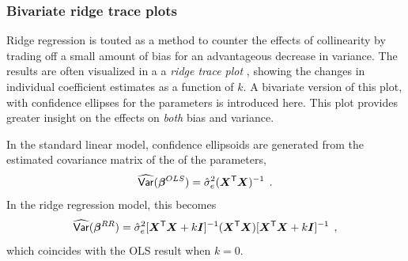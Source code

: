 \subsubsection{Bivariate ridge trace plots}

Ridge regression is touted as a method to counter the effects
of collinearity by trading off a small amount of bias for an
advantageous decrease in variance.  The results are often 
visualized in a a \emph{ridge trace plot}
\citep{HoerlKennard:1970b},
showing the changes
in individual coefficient estimates as a function of $k$.
A bivariate version of this plot, with confidence ellipses for
the parameters is introduced here.  This plot provides greater
insight on the effects on \emph{both} bias and variance.

In the standard linear model, confidence ellipsoids are generated
from the estimated covariance matrix of the of the parameters,
\begin{equation*}
\widehat{\mathsf{Var}} (\bm{\beta}^{OLS}) = \hat{\sigma}^2_e (\bm{X}^\mathsf{T} \bm{X})^{-1} \:\: .
\end{equation*}
In the ridge regression model, this becomes 
\citep{Marquardt:1970}
\begin{equation}
\widehat{\mathsf{Var}} (\bm{\beta}^{RR}) = \hat{\sigma}^2_e 
    [\bm{X}^\mathsf{T} \bm{X} + k \bm{I}]^{-1}
    (\bm{X}^\mathsf{T} \bm{X})
    [\bm{X}^\mathsf{T} \bm{X} + k \bm{I}]^{-1} \:\: ,
\end{equation}
which coincides with the OLS result when $k=0$.
	
